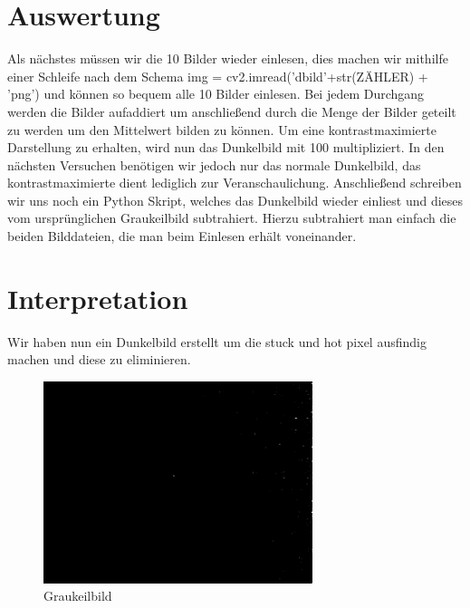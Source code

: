 \documentclass[TGAI_Laborbericht.tex]{subfiles}
\begin{document}
\section{Auswertung}
\label{chap:VERSUCH_2_AUSWERTUNG}

Als nächstes müssen wir die 10 Bilder wieder einlesen, dies machen wir mithilfe einer Schleife nach dem Schema img = cv2.imread('dbild'+str(ZÄHLER) + 'png') und können so bequem alle 10 Bilder einlesen. Bei jedem Durchgang werden die Bilder aufaddiert um anschließend durch die Menge der Bilder geteilt zu werden um den Mittelwert bilden zu können. Um eine kontrastmaximierte Darstellung zu erhalten, wird nun das Dunkelbild mit 100 multipliziert. In den nächsten Versuchen benötigen wir jedoch nur das normale Dunkelbild, das kontrastmaximierte dient lediglich zur Veranschaulichung. Anschließend schreiben wir uns noch ein Python Skript, welches das Dunkelbild wieder einliest und dieses vom ursprünglichen Graukeilbild subtrahiert. Hierzu subtrahiert man einfach die beiden Bilddateien, die man beim Einlesen erhält voneinander.

\section{Interpretation}
\label{chap:VERSUCH_2_INTERPRETATION}

Wir haben nun ein Dunkelbild erstellt um die stuck und hot pixel ausfindig machen und diese zu eliminieren.

\begin{figure}[H]
	\includegraphics[width=0.7\textwidth]{media/test.png}
	\caption{Graukeilbild}
	\label{fig:Sensor}
\end{figure}
\end{document}
